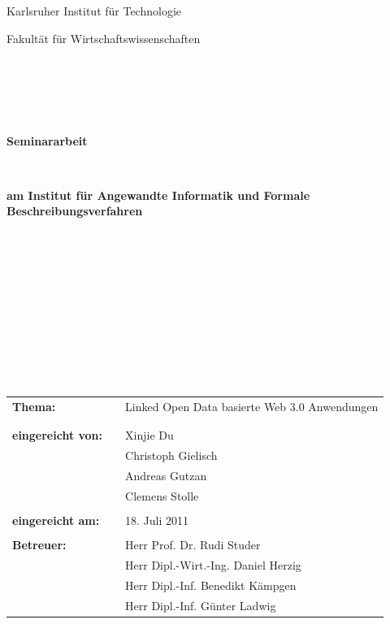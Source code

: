 \documentclass[a4paper, 11pt]{article}
\begin{document}
\thispagestyle{empty}
\begin{center}
\Large{Karlsruher Institut für Technologie}\\
\end{center}

\begin{center}
\Large{Fakultät für Wirtschaftswissenschaften}
\end{center}
\begin{verbatim}





\end{verbatim}
\begin{center}
\textbf{\LARGE{Seminararbeit}}
\end{center}
\begin{verbatim}


\end{verbatim}
\begin{center}
\textbf{am Institut für Angewandte Informatik und Formale Beschreibungsverfahren}
\end{center}
\begin{verbatim}


\end{verbatim}

\begin{verbatim}









\end{verbatim}
\begin{flushleft}
\begin{tabular}{lll}
\textbf{Thema:} & & Linked Open Data basierte Web 3.0 Anwendungen \\
& & \\
& & \\
\textbf{eingereicht von:} & & Xinjie Du\\
& & Christoph Gielisch \\
& & Andreas Gutzan \\
& & Clemens Stolle \\
& & \\
\textbf{eingereicht am:} & & 18. Juli 2011\\
& & \\
\textbf{Betreuer:} & & Herr Prof. Dr. Rudi Studer \\
& & Herr Dipl.-Wirt.-Ing. Daniel Herzig \\
& & Herr Dipl.-Inf. Benedikt Kämpgen \\
& & Herr Dipl.-Inf. Günter Ladwig
\end{tabular}
\end{flushleft}
\end{document}
